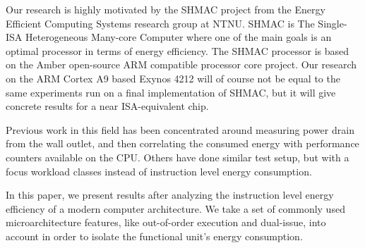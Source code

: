 Our research is highly motivated by the SHMAC project from the Energy Efficient
Computing Systems research group at NTNU. SHMAC is The Single-ISA Heterogeneous
Many-core Computer where one of the main goals is an optimal processor in terms
of energy efficiency. The SHMAC processor is based on the Amber open-source ARM
compatible processor core project. Our research on the ARM Cortex A9
based Exynos 4212 will of course not be equal to the same experiments run on
a final implementation of SHMAC, but it will give concrete results for a near
ISA-equivalent chip.

Previous work in this field has been concentrated around measuring power drain
from the wall outlet, and then correlating the consumed energy with performance
counters available on the CPU\cite{singh}\cite{bertran}\cite{bircher}. Others
have done similar test setup, but with a focus workload classes instead of
instruction level energy consumption\cite{carroll2010analysis}.

In this paper, we present results after analyzing the instruction level energy
efficiency of a modern computer architecture. We take a set of commonly used
microarchitecture features, like out-of-order execution and dual-issue, into
account in order to isolate the functional unit's energy consumption.

